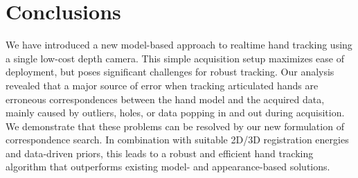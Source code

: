 






%
%

\section{Conclusions}


We have introduced a new model-based approach to realtime hand tracking using a single low-cost depth camera. This simple acquisition setup maximizes ease of deployment, but poses significant challenges for robust tracking.
%
Our analysis revealed that a major source of error when tracking articulated hands are erroneous correspondences between the hand model and the acquired data, mainly caused by outliers, holes, or data popping in and out during acquisition.
We demonstrate that these problems can be resolved by our new formulation of correspondence search. In combination with suitable 2D/3D registration energies and data-driven priors, this leads to a robust and efficient hand tracking algorithm that outperforms existing model- and appearance-based solutions.


